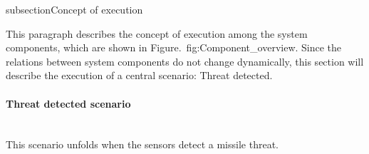 subsection{Concept of execution}

This paragraph describes the concept of execution among the system components, which are shown in Figure.~{fig:Component_overview}. Since the relations between system 
components do not change dynamically, this section will describe the execution of a central scenario: Threat detected.

\paragraph{Threat detected scenario}\mbox{}\\
This scenario unfolds when the sensors detect a missile threat.




